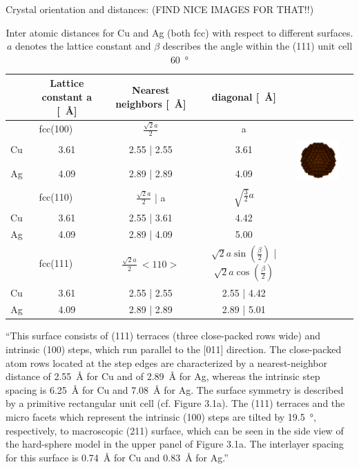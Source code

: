 Crystal orientation and distances: (FIND NICE IMAGES FOR THAT!!)
\begin{table}
\centering
\caption{Inter atomic distances for Cu and Ag (both fcc) with respect to different surfaces. $a$ denotes the lattice constant and $\beta$ describes the angle within the (111) unit cell \SI{60}{\degree}}
  \begin{tabular}{cccccc}
& Lattice constant a [\SI{}{\angstrom}] & Nearest neighbors [\SI{}{\angstrom}] & diagonal [\SI{}{\angstrom}] & \\ \hline \hline
\multicolumn{2}{c}{fcc(100)} & $\frac{\sqrt{2}a}{2}$ & a & \\
  Cu	 	& 3.61	& 2.55 | 2.55 & 3.61 & \multirow{2}{*}{\includegraphics[width=4cm]{./images/fcc-111-persp}} \\
  Ag		& 4.09	& 2.89 | 2.89 & 4.09 & \\ \hline 
\multicolumn{2}{c}{fcc(110)} & $\frac{\sqrt{2}a}{2}$ | a & $\sqrt{\frac{3}{2}}a$& \\
  Cu	 	& 3.61	& 2.55 | 3.61	& 4.42 & \\
  Ag		& 4.09	& 2.89 | 4.09	& 5.00 & \\ \hline 
\multicolumn{2}{c}{fcc(111)} & $\frac{\sqrt{2}a}{2} \ <110>$ & $\sqrt{2}a\sin(\frac{\beta}{2})$ | $\sqrt{2}a\cos(\frac{\beta}{2})$\\
  Cu 		& 3.61	& 2.55 | 2.55	& 2.55 | 4.42 & \\
  Ag		& 4.09	& 2.89 | 2.89	& 2.89 | 5.01 & \\ \hline
 \end{tabular}

\end{table}
 
 ``This surface consists of (111) terraces (three close-packed rows wide) and intrinsic (100) steps, which run parallel to the [011] direction. The close-packed atom rows located at the step edges are characterized by
a nearest-neighbor distance of \SI{2.55}{\angstrom}  for Cu and of \SI{2.89}{\angstrom} for Ag, whereas the intrinsic step
spacing is \SI{6.25}{\angstrom} for Cu and \SI{7.08}{\angstrom} for Ag. The surface symmetry is described by a primitive
rectangular unit cell (cf. Figure 3.1a). The (111) terraces and the micro facets which represent the intrinsic (100) steps are tilted by \SI{19.5}{\degree}, respectively, to macroscopic (211) surface, which can be seen in the side view of the hard-sphere model in the upper panel of Figure 3.1a. The interlayer spacing for this surface is \SI{0.74}{\angstrom} for Cu and \SI{0.83}{\angstrom} for Ag.''

